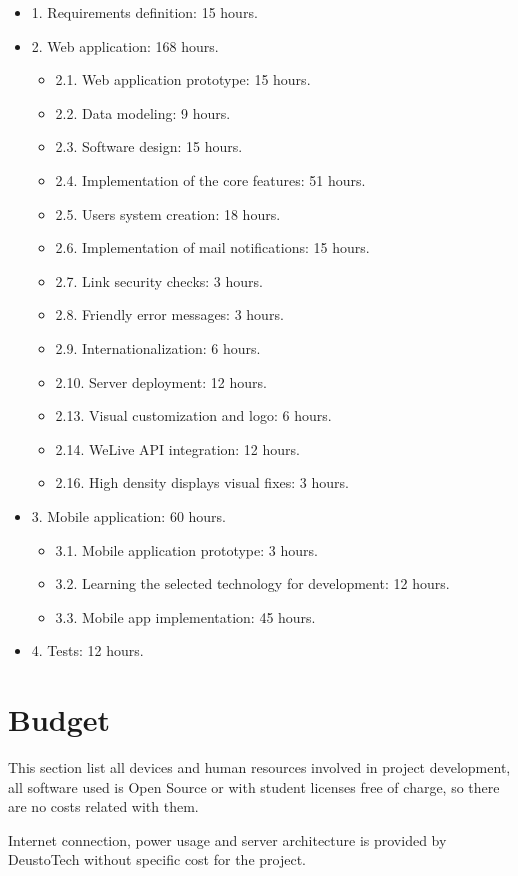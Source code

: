 \documentclass{DeustoFDP}
\begin{document}
\begin{itemize}
	\item 1. Requirements definition: 15 hours.
	\item 2. Web application: 168 hours.
	\begin{itemize}
		\item 2.1. Web application prototype: 15 hours.
		\item 2.2. Data modeling: 9 hours.
		\item 2.3. Software design: 15 hours.
		\item 2.4. Implementation of the core features: 51 hours.
		\item 2.5. Users system creation: 18 hours.
		\item 2.6. Implementation of mail notifications: 15 hours.
		\item 2.7. Link security checks: 3 hours.
		\item 2.8. Friendly error messages: 3 hours.
		\item 2.9. Internationalization: 6 hours.
		\item 2.10. Server deployment: 12 hours.
		\item 2.13. Visual customization and logo: 6 hours.
		\item 2.14. WeLive API integration: 12 hours.
		\item 2.16. High density displays visual fixes: 3 hours.
	\end{itemize}
	\item 3. Mobile application: 60 hours.
	\begin{itemize}
		\item 3.1. Mobile application prototype: 3 hours.
		\item 3.2. Learning the selected technology for development: 12 hours.
		\item 3.3. Mobile app implementation: 45 hours.
	\end{itemize}
	\item 4. Tests: 12 hours.
\end{itemize}
\chapter{Budget}\label{cha:budget}
This section list all devices and human resources involved in project development, all software used is Open Source or with student licenses free of charge, so there are no costs related with them.

Internet connection, power usage and server architecture is provided by DeustoTech without specific cost for the project.
\end{document}
